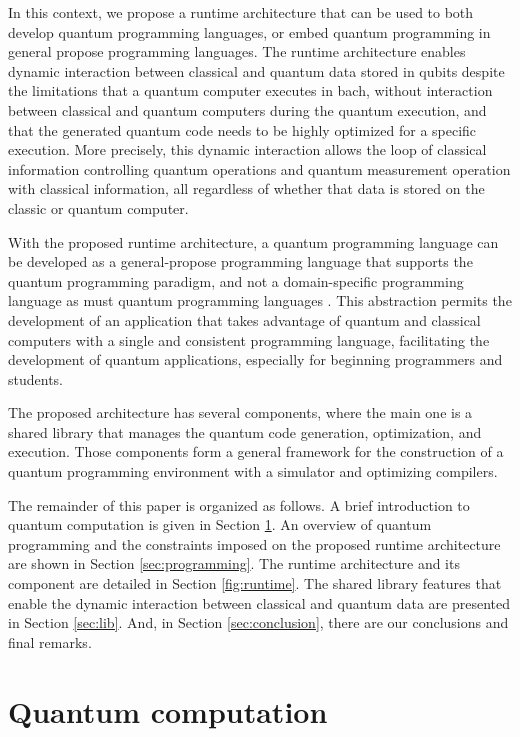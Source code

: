 \documentclass[preprint,3p,times,twocolumn]{elsarticle}
\begin{document}
In this context, we propose a runtime architecture that can be used to both
develop quantum programming languages, or embed quantum programming in general
propose programming languages. The runtime architecture enables dynamic
interaction between classical and quantum data stored in qubits despite the
limitations that a quantum computer executes in bach, without interaction
between classical and quantum computers during the quantum execution, and that
the generated quantum code needs to be highly optimized for a specific
execution. More precisely, this dynamic interaction allows the loop of
classical information controlling quantum operations and quantum measurement
operation with classical information, all regardless of whether that data is
stored on the classic or quantum computer. 

With the proposed runtime architecture, a quantum programming language can be
developed as a general-propose programming language that supports the quantum
programming paradigm, and not a domain-specific programming language as must
quantum programming languages
\cite{Svore2018,Lapets2013,Wecker2014,Steiger2018}. This abstraction permits
the development of an application that takes advantage of quantum and classical
computers with a single and consistent programming language,  facilitating the
development of quantum applications, especially for beginning programmers and
students.

The proposed architecture has several components, where the main one is a
shared library that manages the quantum code generation, optimization, and
execution. Those components form a general framework for the construction of a
quantum programming environment with a simulator and optimizing compilers. 

The remainder of this paper is organized as follows. A brief introduction to
quantum computation is given in Section \ref{sec:computing}. An overview of
quantum programming and the constraints imposed on the proposed runtime
architecture are shown in Section \ref{sec:programming}.  The runtime
architecture and its component are detailed in Section \ref{fig:runtime}.  The
shared library features that enable the dynamic interaction between classical
and quantum data are presented in Section \ref{sec:lib}. And,  in Section
\ref{sec:conclusion}, there are our conclusions and final remarks. 

\section{Quantum computation}
\label{sec:computing}
\end{document}
